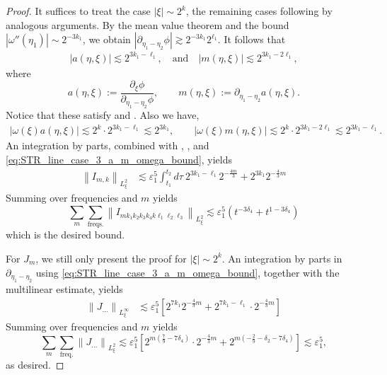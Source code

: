 \documentclass[reqno,english,11pt]{amsart}
\newcommand{\eps}{\varepsilon}
\newcommand{\snorm}[1]{\left\|#1\right\|}
\theoremstyle{definition}
\numberwithin{equation}{section}
\begin{document}
\begin{proof}
It suffices to treat the case $|\xi|\sim 2^k$, the remaining cases following
by analogous arguments. By the mean value theorem and the bound $|\omega''(\eta_1)|\sim 2^{-3k_1}$, we obtain $|\partial_{\eta_1-\eta_2}\phi| \gtrsim 2^{-3k_1}2^{\ell_1}$. It follows that 
    \begin{align}
    \label{eq:STR_line_case_3_a_m_bound}
        \left|a(\eta,\xi)\right|\lesssim 2^{3k_1-\ell_1}, \quad \text{and} \quad 
         \left|m(\eta,\xi)\right|\lesssim 2^{3k_1-2\ell_1},
    \end{align}
    where
    \begin{equation*}
        a(\eta,\xi):=\frac{\partial_{\xi}\phi}{\partial_{\eta_1-\eta_2}\phi},\qquad m(\eta,\xi):=\partial_{\eta_1-\eta_2}a(\eta,\xi).
    \end{equation*}
Notice that these satisfy \cite[Lemma B.3]{Morgan} and \cite[Lemma B.4]{Morgan}. Also we have,
    \begin{align}
\label{eq:STR_line_case_3_a_m_omega_bound}
        \left|\omega(\xi)a(\eta,\xi)\right| \lesssim 2^{k}\cdot2^{3k_1-\ell_1}\lesssim 2^{3k_1},\qquad\left|\omega(\xi)m(\eta,\xi)\right|\lesssim 2^{k}\cdot2^{3k_1-2\ell_1}\lesssim 2^{3k_1-\ell_1}. 
    \end{align}
An integration by parts, combined with \cite[Lemma~B.3]{Morgan}, \cite[Proposition~B.1]{Morgan}, and
\eqref{eq:STR_line_case_3_a_m_omega_bound}, yields
\begin{align*}
   \snorm{I_{m,k}}_{L^2_{\xi}} &\lesssim \eps_1^5 \int_{t_1}^{t_2}d\tau \ 2^{3k_1-\ell_1}2^{-\frac{4m}{3}} +  2^{3k_1}2^{-\frac{4}{3}m}
 \end{align*}
 Summing over frequencies and  $m$  yields
\begin{equation}
\sum_{m}\sum_{\text{freqs.}}  \snorm{I_{mk_1k_2k_3k_4k\ell_1\ell_2\ell_3}}_{L^2_{\xi}} \lesssim \eps_1^5 \left(t^{-3\delta_4} 
 +t^{1-3\delta_4} \right)
\end{equation}
which is the desired bound.

For $J_m$, we still only present the proof for $|\xi|\sim 2^k$. An integration by parts in $\partial_{\eta_1-\eta_2}$ using \eqref{eq:STR_line_case_3_a_m_omega_bound}, together with the multilinear estimate, yields
\begin{align*}
   \snorm{J_{...}}_{L^\infty_{\xi}}
   &\lesssim \eps_1^5 \left[2^{7k_1}2^{-\frac{4}{3}m} + 2^{7k_1-\ell_1}\cdot 2^{-\frac{4}{3}m}\right]
\end{align*}
Summing over frequencies and $m$ yields
\begin{equation}
    \sum_m \sum_{\text{freq.}}  \snorm{J_{...}}_{L^2_{\xi}} \lesssim \eps_1^5\left[2^{m(\frac{7}{9}-7\delta_4)}\cdot2^{-\frac{4}{3}m}+2^{m(-\frac{2}{9}-\delta_2-7\delta_4)}\right]\lesssim \eps_1^5,
\end{equation}
as desired.
\end{proof}
\end{document}
